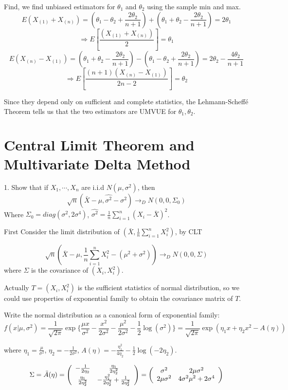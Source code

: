 \documentclass[11pt]{report}
\begin{document}
Find, we find unbiased estimators for $\theta_1$ and $\theta_2$ using the sample min and max.
\[ E( X_{(1)} + X_{(n)} ) = \left( \theta_1 - \theta_2 + \frac{2 \theta_2}{n+1} \right) + \left( \theta_1 + \theta_2 - \frac{2 \theta_2}{n+1} \right) = 2 \theta_1 \]
\[ \Rightarrow E \left[ \frac{( X_{(1)} + X_{(n)} )}{2} \right] = \theta_1 \]
\[ E( X_{(n)} - X_{(1)} ) = \left( \theta_1 + \theta_2 - \frac{2 \theta_2}{n+1} \right) - \left( \theta_1 - \theta_2 + \frac{2 \theta_2}{n+1} \right) = 2 \theta_2 - \frac{4 \theta_2}{n+1} \]
\[ \Rightarrow E \left[ \frac{ (n+1) \left( X_{(n)} - X_{(1)} \right) }{2n-2} \right] = \theta_2 \]

Since they depend only on sufficient and complete statistics, the Lehmann-Scheff\'{e} Theorem tells us that the two estimators are UMVUE for $\theta_1, \theta_2$.

\chapter{Central Limit Theorem and Multivariate Delta Method}
1. Show that if $X_1,\cdots,X_n$ are i.i.d $N(\mu,\sigma^2)$, then
\[\sqrt{n}(\bar{X}-\mu,\hat{\sigma^2}-\sigma^2) \rightarrow_D N(0,0,\Sigma_0) \]
Where $\Sigma_0=diag(\sigma^2,2\sigma^4)$, $\hat{\sigma^2}=\frac{1}{n}\sum_{i=1}^{n}(X_i-\bar{X})^2$.

First Consider the limit distribution of $(\bar{X},\frac{1}{n}\sum_{i=1}^{n}X_i^2)$, by CLT

\[\sqrt{n}(\bar{X}-\mu,\frac{1}{n}\sum_{i=1}^{n}X_i^2-(\mu^2+\sigma^2))\rightarrow_D N(0,0,\Sigma)\] where $\Sigma$ is the covariance of $(X_i,X_i^2)$.

Actually $T=(X_i,X_i^2)$ is the sufficient statistics of normal distribution, so we could use properties of exponential family to obtain the covariance matrix of $T$.

Write the normal distribution as a canonical form of exponential family:
\[f(x|\mu,\sigma^2)=\frac{1}{\sqrt{2\pi}}\exp\{\frac{\mu x}{\sigma^2}-\frac{x^2}{2\sigma^2}-\frac{\mu^2}{2\sigma^2}-\frac{1}{2}\log(\sigma^2)\}=\frac{1}{\sqrt{2\pi}}\exp(\eta_1 x+\eta_2x^2-A(\eta))\]

where $\eta_1=\frac{\mu}{\sigma^2}$, $\eta_2=- \frac{1}{2\sigma^2}$, $A(\eta)=-\frac{\eta_1^2}{4\eta_2}-\frac{1}{2}\log(-2\eta_2)$.

\[\Sigma=\ddot{A}(\eta)=\left(\begin{array}{c c}
-\frac{1}{2\eta_2} & \frac{\eta_1}{2\eta_2^2}\\
\frac{\eta_1}{2\eta_2^2} & -\frac{\eta_1^2}{2\eta_2^3}+\frac{1}{2\eta_2^2}\\
\end{array}
\right)=\left(
\begin{array}{cc}
\sigma^2 & 2\mu\sigma^2\\
2\mu\sigma^2 & 4\sigma^2\mu^2+2\sigma^4

\end{array}\right)\]
\end{document}
